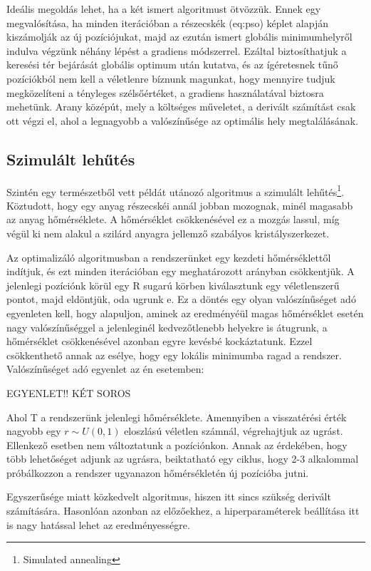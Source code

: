 Ideális megoldás lehet, ha a két ismert algoritmust ötvözzük. Ennek egy megvalósítása, ha minden iterációban a részecskék \aref({eq:pso}) képlet alapján kiszámolják az új pozíciójukat, majd az ezután ismert globális minimumhelyről indulva végzünk néhány lépést a gradiens módszerrel. Ezáltal biztosíthatjuk a keresési tér bejárását globális optimum után kutatva, és az ígéretesnek tűnő pozíciókból nem kell a véletlenre bíznunk magunkat, hogy mennyire tudjuk megközelíteni a tényleges szélsőértéket, a gradiens használatával biztosra mehetünk. Arany középút, mely a költséges műveletet, a derivált számítást csak ott végzi el, ahol a legnagyobb a valószínűsége az optimális hely megtalálásának.

\subsection{Szimulált lehűtés}

Szintén egy természetből vett példát utánozó algoritmus a szimulált lehűtés\footnote{Simulated annealing}. Köztudott, hogy egy anyag részecskéi annál jobban mozognak, minél magasabb az anyag hőmérséklete. A hőmérséklet csökkenésével ez a mozgás lassul, míg végül ki nem alakul a szilárd anyagra jellemző szabályos kristályszerkezet.

Az optimalizáló algoritmusban a rendszerünket egy kezdeti hőmérséklettől indítjuk, és ezt minden iterációban egy meghatározott arányban csökkentjük. A jelenlegi pozíciónk körül egy R sugarú körben kiválasztunk egy véletlenszerű pontot, majd eldöntjük, oda ugrunk e. Ez a döntés egy olyan valószínűséget adó egyenleten kell, hogy alapuljon, aminek az eredményéül magas hőmérséklet esetén nagy valószínűséggel a jelenleginél kedvezőtlenebb helyekre is átugrunk, a hőmérséklet csökkenésével azonban egyre kevésbé kockáztatunk. Ezzel csökkenthető annak az esélye, hogy egy lokális minimumba ragad a rendszer.
Valószínűséget adó egyenlet az én esetemben:

EGYENLET!! KÉT SOROS

Ahol T a rendszerünk jelenlegi hőmérséklete. Amennyiben a visszatérési érték nagyobb egy $r\sim U(0,1)$ eloszlású véletlen számnál, végrehajtjuk az ugrást. Ellenkező esetben nem változtatunk a pozíciónkon. Annak az érdekében, hogy több lehetőséget adjunk az ugrásra, beiktatható egy ciklus, hogy 2-3 alkalommal próbálkozzon a rendszer ugyanazon hőmérsékletén új pozícióba jutni.

Egyszerűsége miatt közkedvelt algoritmus, hiszen itt sincs szükség derivált számítására. Hasonlóan azonban az előzőekhez, a hiperparaméterek beállítása itt is nagy hatással lehet az eredményességre.

